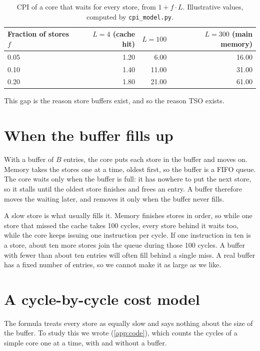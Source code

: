 \begin{table}[!htbp]
\centering\small
\caption{CPI of a core that waits for every store, from $1 + f\cdot L$. Illustrative values, computed by \texttt{cpi\_model.py}.}
\label{tab:boe}
\begin{tabular}{@{}lrrr@{}}
\toprule
Fraction of stores $f$ & $L = 4$ (cache hit) & $L = 100$ & $L = 300$ (main memory)\\
\midrule
0.05 & 1.20 & 6.00 & 16.00\\
0.10 & 1.40 & 11.00 & 31.00\\
0.20 & 1.80 & 21.00 & 61.00\\
\bottomrule
\end{tabular}
\end{table}

This gap is the reason store buffers exist, and so the reason TSO exists.

\section{When the buffer fills up}
\label{sec:buffervsfull}

With a buffer of $B$ entries, the core puts each store in the buffer and moves on. Memory takes the stores one at a time, oldest first, so the buffer is a FIFO queue. The core waits only when the buffer is full: it has nowhere to put the next store, so it stalls until the oldest store finishes and frees an entry. A buffer therefore moves the waiting later, and removes it only when the buffer never fills.

A slow store is what usually fills it. Memory finishes stores in order, so while one store that missed the cache takes 100 cycles, every store behind it waits too, while the core keeps issuing one instruction per cycle. If one instruction in ten is a store, about ten more stores join the queue during those 100 cycles. A buffer with fewer than about ten entries will often fill behind a single miss. A real buffer has a fixed number of entries, so we cannot make it as large as we like.

\section{A cycle-by-cycle cost model}
\label{sec:cpimodel}

The formula treats every store as equally slow and says nothing about the size of the buffer. To study this we wrote  (\cref{app:code}), which counts the cycles of a simple core one at a time, with and without a buffer.


